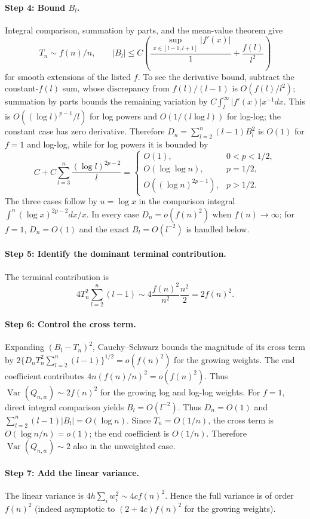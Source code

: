 \documentclass[11pt]{article}
\theoremstyle{definition}
\begin{document}
\paragraph{Step 4: Bound $B_l$.}
Integral comparison, summation by parts, and the mean-value theorem give
\[
T_n\sim f(n)/n,\qquad
|B_l|\le C\left(\frac{\sup_{x\in[l-1,l+1]}|f'(x)|}{1}
+\frac{f(l)}{l^2}\right)
\]
for smooth extensions of the listed $f$. To see the derivative bound, subtract the constant-$f(l)$ sum, whose discrepancy from $f(l)/(l-1)$ is $O(f(l)/l^2)$; summation by parts bounds the remaining variation by $C\int_l^\infty |f'(x)|x^{-1}dx$. This is $O((\log l)^{p-1}/l)$ for log powers and $O(1/(l\log l))$ for log-log; the constant case has zero derivative. Therefore $D_n=\sum_{l=2}^n(l-1)B_l^2$ is $O(1)$ for $f=1$ and log-log, while for log powers it is bounded by
\[
C+C\sum_{l=3}^n\frac{(\log l)^{2p-2}}l
=\begin{cases}
O(1),&0<p<1/2,\\
O(\log\log n),&p=1/2,\\
O((\log n)^{2p-1}),&p>1/2.
\end{cases}
\]
The three cases follow by $u=\log x$ in the comparison integral $\int^n(\log x)^{2p-2}dx/x$. In every case $D_n=o(f(n)^2)$ when $f(n)\to\infty$; for $f=1$, $D_n=O(1)$ and the exact $B_l=O(l^{-2})$ is handled below.

\paragraph{Step 5: Identify the dominant terminal contribution.}
The terminal contribution is
\[
4T_n^2\sum_{l=2}^n(l-1)\sim
4\frac{f(n)^2}{n^2}\frac{n^2}{2}=2f(n)^2.
\]
\paragraph{Step 6: Control the cross term.}
Expanding $(B_l-T_n)^2$, Cauchy--Schwarz bounds the magnitude of its cross term by
$2\{D_n T_n^2\sum_{l=2}^n(l-1)\}^{1/2}=o(f(n)^2)$ for the growing weights. The end coefficient contributes $4n(f(n)/n)^2=o(f(n)^2)$. Thus $\operatorname{Var}(Q_{n,w})\sim2f(n)^2$ for the growing log and log-log weights. For $f=1$, direct integral comparison yields $B_l=O(l^{-2})$. Thus $D_n=O(1)$ and $\sum_{l=2}^n(l-1)|B_l|=O(\log n)$. Since $T_n=O(1/n)$, the cross term is $O(\log n/n)=o(1)$; the end coefficient is $O(1/n)$. Therefore $\operatorname{Var}(Q_{n,w})\sim2$ also in the unweighted case.

\paragraph{Step 7: Add the linear variance.}
The linear variance is $4h\sum_iw_i^2\sim4c f(n)^2$. Hence the full variance is of order $f(n)^2$ (indeed asymptotic to $(2+4c)f(n)^2$ for the growing weights).
\end{document}
